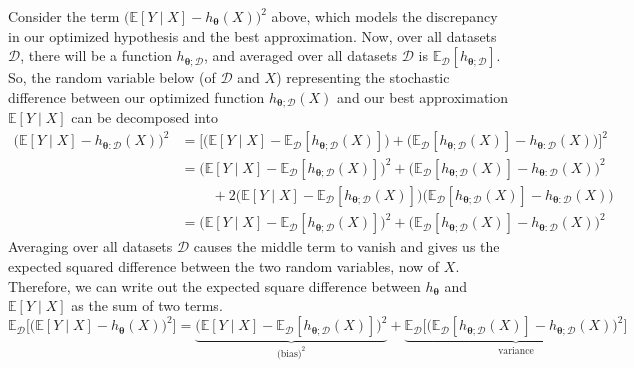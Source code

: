 \documentclass{article}
\theoremstyle{definition}
\begin{document}
    Consider the term $\big(\mathbb{E}[Y \mid X] - h_{\boldsymbol{\theta}}(X) \big)^2$ above, which models the discrepancy in our optimized hypothesis and the best approximation. Now, over all datasets $\mathcal{D}$, there will be a function $h_{{\boldsymbol{\theta}}; \mathcal{D}}$, and averaged over all datasets $\mathcal{D}$ is $\mathbb{E}_\mathcal{D} [ h_{{\boldsymbol{\theta}}; \mathcal{D}}]$. So, the random variable below (of $\mathcal{D}$ and $X$) representing the stochastic difference between our optimized function $h_{{\boldsymbol{\theta}}; \mathcal{D}} (X)$ and our best approximation $\mathbb{E}[Y\mid X]$ can be decomposed into 
    \begin{align*}
        \big(\mathbb{E}[Y \mid X] - h_{{\boldsymbol{\theta}}:\mathcal{D}} (X) \big)^2 & =  \big[ \big( \mathbb{E}[Y \mid X] - \mathbb{E}_\mathcal{D} [h_{{\boldsymbol{\theta}}; \mathcal{D}} (X)] \big) + \big( \mathbb{E}_\mathcal{D} [h_{{\boldsymbol{\theta}}; \mathcal{D}} (X)] - h_{{\boldsymbol{\theta}}:\mathcal{D}} (X) \big) \big]^2 \\
        & = \big( \mathbb{E}[Y \mid X] - \mathbb{E}_\mathcal{D} [h_{{\boldsymbol{\theta}}; \mathcal{D}} (X)] \big)^2 + \big( \mathbb{E}_\mathcal{D} [h_{{\boldsymbol{\theta}}; \mathcal{D}} (X)] - h_{{\boldsymbol{\theta}}:\mathcal{D}} (X) \big)^2 \\
        & \;\;\;\;\;\;\;\; + 2 \big( \mathbb{E}[Y \mid X] - \mathbb{E}_\mathcal{D} [h_{{\boldsymbol{\theta}}; \mathcal{D}} (X)] \big) \big( \mathbb{E}_\mathcal{D} [h_{{\boldsymbol{\theta}}; \mathcal{D}} (X)] - h_{{\boldsymbol{\theta}}:\mathcal{D}} (X) \big) \\
        & = \big( \mathbb{E}[Y \mid X] - \mathbb{E}_\mathcal{D} [h_{{\boldsymbol{\theta}}; \mathcal{D}} (X)] \big)^2 + \big( \mathbb{E}_\mathcal{D} [h_{{\boldsymbol{\theta}}; \mathcal{D}} (X)] - h_{{\boldsymbol{\theta}}:\mathcal{D}} (X) \big)^2 
    \end{align*}
    Averaging over all datasets $\mathcal{D}$ causes the middle term to vanish and gives us the expected squared difference between the two random variables, now of $X$. Therefore, we can write out the expected square difference between $h_{\boldsymbol{\theta}}$ and $\mathbb{E}[Y\mid X]$ as the sum of two terms. 
    \[\mathbb{E}_\mathcal{D} \big[ \big(\mathbb{E}[Y \mid X] - h_{\boldsymbol{\theta}}(X) \big)^2 \big] = \underbrace{\big( \mathbb{E}[Y \mid X] - \mathbb{E}_\mathcal{D} [h_{{\boldsymbol{\theta}}; \mathcal{D}} (X)] \big)^2}_{\text{(bias)}^2} + \underbrace{ \mathbb{E}_\mathcal{D} \big[ \big( \mathbb{E}_\mathcal{D} [h_{{\boldsymbol{\theta}}; \mathcal{D}} (X)] - h_{\boldsymbol{\theta}; \mathcal{D}}(X) \big)^2 \big]}_{\text{variance}}\]
\end{document}
